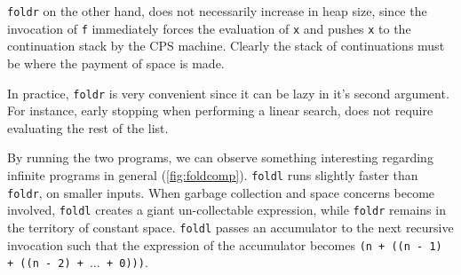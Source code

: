 \texttt{foldr} on the other hand, does not necessarily increase in heap size, since the invocation of \texttt{f} immediately forces the evaluation of \texttt{x} and pushes \texttt{x} to the continuation stack by the CPS machine.
Clearly the stack of continuations must be where the payment of space is made.
\begin{remark}
  In practice, \texttt{foldr} is very convenient since it can be lazy in it's second argument. 
  For instance, early stopping when performing a linear search, does not require evaluating the rest of the list.
\end{remark}

By running the two programs, we can observe something interesting regarding infinite programs in general (\autoref{fig:foldcomp}).
\texttt{foldl} runs slightly faster than \texttt{foldr}, on smaller inputs.
When garbage collection and space concerns become involved, \texttt{foldl} creates a giant un-collectable expression, while \texttt{foldr} remains in the territory of constant space.
\texttt{foldl} passes an accumulator to the next recursive invocation such that the expression of the accumulator becomes \texttt{(n + ((n - 1) + ((n - 2) + $\dots$ + 0)))}.
